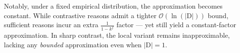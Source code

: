 \documentclass{article}
\begin{document}
Notably, under a fixed empirical distribution, the approximation becomes constant. While contrastive reasons admit a tighter $\mathcal{O}(\ln(|\text{D}|))$ bound, sufficient reasons incur an extra $\frac{1}{1 - k^f}$ factor --- yet still yield a constant-factor approximation. In sharp contrast, the local variant remains inapproximable, lacking any \emph{bounded} approximation even when $|\text{D}| = 1$.








\end{document}
